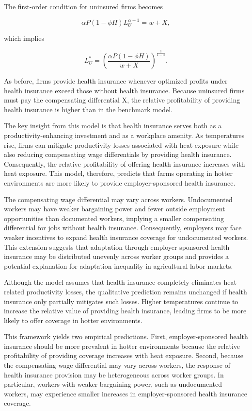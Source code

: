 \documentclass[12pt]{article}
\begin{document}
The first-order condition for uninsured firms becomes

\begin{equation}
\alpha P(1-\phi H)L_U^{\alpha-1}
=
w+X,
\end{equation}

which implies

\begin{equation}
L_U^*
=
\left(
\frac{\alpha P(1-\phi H)}
{w+X}
\right)^{\frac{1}{1-\alpha}}.
\end{equation}

As before, firms provide health insurance whenever optimized profits under health insurance exceed those without health insurance.
Because uninsured firms must pay the compensating differential X, the relative profitability of providing health insurance is higher than in the benchmark model.

The key insight from this model is that health insurance serves both as a productivity-enhancing investment and as a workplace amenity. As temperatures rise, firms can mitigate productivity losses associated with heat exposure while also reducing compensating wage differentials by providing health insurance. Consequently, the relative profitability of offering health insurance increases with heat exposure. This model, therefore, predicts that farms operating in hotter environments are more likely to provide employer-sponsored health insurance.

The compensating wage differential may vary across workers. Undocumented workers may have weaker bargaining power and fewer outside employment opportunities than documented workers, implying a smaller compensating differential for jobs without health insurance. Consequently, employers may face weaker incentives to expand health insurance coverage for undocumented workers. This extension suggests that adaptation through employer-sponsored health insurance may be distributed unevenly across worker groups and provides a potential explanation for adaptation inequality in agricultural labor markets.

Although the model assumes that health insurance completely eliminates heat-related productivity losses, the qualitative prediction remains unchanged if health insurance only partially mitigates such losses. Higher temperatures continue to increase the relative value of providing health insurance, leading firms to be more likely to offer coverage in hotter environments.

This framework yields two empirical predictions. First, employer-sponsored health insurance should be more prevalent in hotter environments because the relative profitability of providing coverage increases with heat exposure. Second, because the compensating wage differential may vary across workers, the response of health insurance provision may be heterogeneous across worker groups. In particular, workers with weaker bargaining power, such as undocumented workers, may experience smaller increases in employer-sponsored health insurance coverage.
\end{document}
